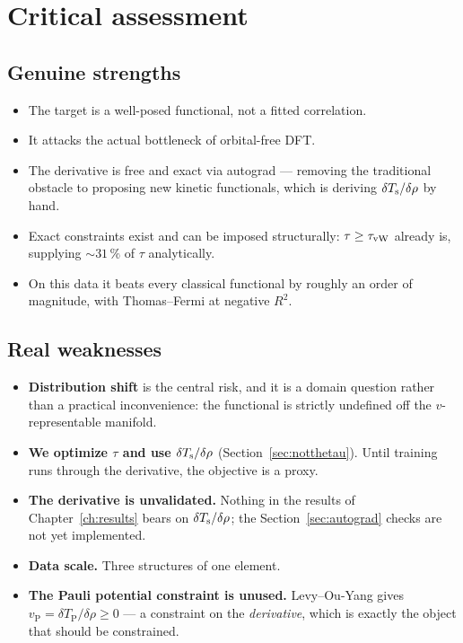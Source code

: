 \section{Critical assessment}

\subsection{Genuine strengths}

\begin{itemize}
  \item The target is a well-posed functional, not a fitted correlation.
  \item It attacks the actual bottleneck of orbital-free DFT.
  \item The derivative is free and exact via autograd --- removing the
    traditional obstacle to proposing new kinetic functionals, which is
    deriving $\delta T_{\mathrm{s}}/\delta\rho$ by hand.
  \item Exact constraints exist and can be imposed structurally:
    $\tau\ge\tau_{\mathrm{vW}}$ already is, supplying $\sim31\,\%$ of $\tau$ analytically.
  \item On this data it beats every classical functional by roughly an order of
    magnitude, with Thomas--Fermi at negative $R^2$.
\end{itemize}

\subsection{Real weaknesses}

\begin{itemize}
  \item \textbf{Distribution shift} is the central risk, and it is a domain
    question rather than a practical inconvenience: the functional is strictly
    undefined off the $v$-representable manifold.
  \item \textbf{We optimize $\tau$ and use $\delta T_{\mathrm{s}}/\delta\rho$}
    (Section~\ref{sec:notthetau}). Until training runs through the derivative,
    the objective is a proxy.
  \item \textbf{The derivative is unvalidated.} Nothing in the results of
    Chapter~\ref{ch:results} bears on $\delta T_{\mathrm{s}}/\delta\rho$; the
    Section~\ref{sec:autograd} checks are not yet implemented.
  \item \textbf{Data scale.} Three structures of one element.
  \item \textbf{The Pauli potential constraint is unused.} Levy--Ou-Yang gives
    $v_{\mathrm{P}}=\delta T_{\mathrm{P}}/\delta\rho\ge0$ --- a constraint on
    the \emph{derivative}, which is exactly the object that should be
    constrained.
\end{itemize}

